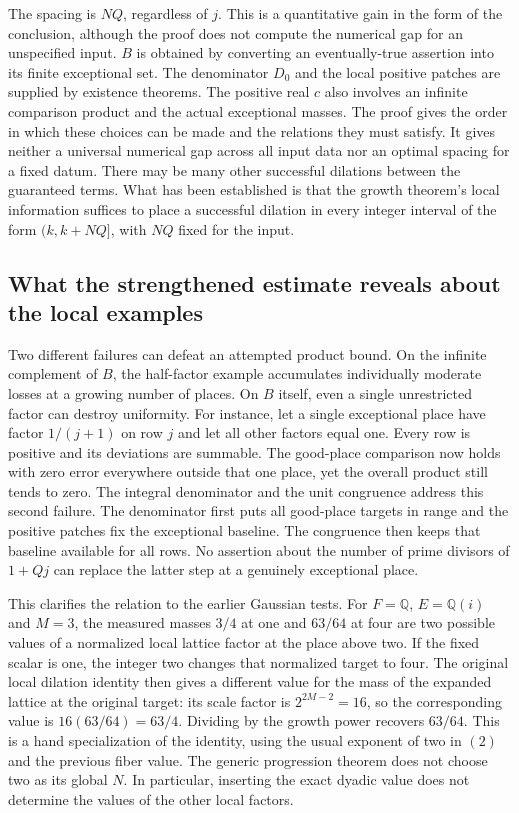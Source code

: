 \documentclass[12pt,letterpaper]{article}
\begin{document}
The spacing is $NQ$, regardless of $j$. This is a quantitative gain in the form of the conclusion, although the proof does not compute the numerical gap for an unspecified input. $B$ is obtained by converting an eventually-true assertion into its finite exceptional set. The denominator $D_0$ and the local positive patches are supplied by existence theorems. The positive real $c$ also involves an infinite comparison product and the actual exceptional masses. The proof gives the order in which these choices can be made and the relations they must satisfy. It gives neither a universal numerical gap across all input data nor an optimal spacing for a fixed datum. There may be many other successful dilations between the guaranteed terms. What has been established is that the growth theorem's local information suffices to place a successful dilation in every integer interval of the form $(k,k+NQ]$, with $NQ$ fixed for the input.

\subsection{What the strengthened estimate reveals about the local examples}

Two different failures can defeat an attempted product bound. On the infinite complement of $B$, the half-factor example accumulates individually moderate losses at a growing number of places. On $B$ itself, even a single unrestricted factor can destroy uniformity. For instance, let a single exceptional place have factor $1/(j+1)$ on row $j$ and let all other factors equal one. Every row is positive and its deviations are summable. The good-place comparison now holds with zero error everywhere outside that one place, yet the overall product still tends to zero. The integral denominator and the unit congruence address this second failure. The denominator first puts all good-place targets in range and the positive patches fix the exceptional baseline. The congruence then keeps that baseline available for all rows. No assertion about the number of prime divisors of $1+Qj$ can replace the latter step at a genuinely exceptional place.

This clarifies the relation to the earlier Gaussian tests. For $F=\mathbb Q$, $E=\mathbb Q(i)$ and $M=3$, the measured masses $3/4$ at one and $63/64$ at four are two possible values of a normalized local lattice factor at the place above two. If the fixed scalar is one, the integer two changes that normalized target to four. The original local dilation identity then gives a different value for the mass of the expanded lattice at the original target: its scale factor is $2^{2M-2}=16$, so the corresponding value is $16(63/64)=63/4$. Dividing by the growth power recovers $63/64$. This is a hand specialization of the identity, using the usual exponent of two in $(2)$ and the previous fiber value. The generic progression theorem does not choose two as its global $N$. In particular, inserting the exact dyadic value does not determine the values of the other local factors.
\end{document}

